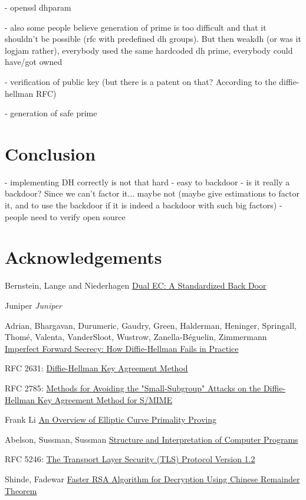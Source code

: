 \documentclass[a4paper,11pt]{article}
\begin{document}
- openssl dhparam

- also some people believe generation of prime is too difficult and that it shouldn't be possible (rfc with predefined dh groups). But then weakdh (or was it logjam rather), everybody used the same hardcoded dh prime, everybody could have/got owned

- verification of public key (but there is a patent on that? According to the diffie-hellman RFC)

- generation of safe prime


\section{Conclusion}

- implementing DH correctly is not that hard
- easy to backdoor
- is it really a backdoor? Since we can't factor it... maybe not (maybe give estimations to factor it, and to use the backdoor if it is indeed a backdoor with such big factors)
- people need to verify open source

\newpage

\section*{Acknowledgements}


\newpage

\begin{thebibliography}{1}

 Bernstein, Lange and Niederhagen \href{https://eprint.iacr.org/2015/767.pdf}{Dual EC: A Standardized Back Door}

 Juniper {\em Juniper}

 Adrian, Bhargavan, Durumeric, Gaudry, Green, Halderman, Heninger, Springall, Thomé, Valenta,  VanderSloot, Wustrow, Zanella-Béguelin, Zimmermann \href{https://weakdh.org/imperfect-forward-secrecy-ccs15.pdf}{Imperfect Forward Secrecy: How Diffie-Hellman Fails in Practice}

 RFC 2631: \href{https://tools.ietf.org/html/rfc2631}{Diffie-Hellman Key Agreement Method}

 RFC 2785: \href{https://tools.ietf.org/html/rfc2785}{Methods for Avoiding the "Small-Subgroup" Attacks on the Diffie-Hellman Key Agreement Method for S/MIME}

 Frank Li \href{http://theory.stanford.edu/~dfreeman/cs259c-f11/finalpapers/primalityproving.pdf}{An Overview of Elliptic Curve Primality Proving}

 Abelson, Sussman, Sussman \href{https://mitpress.mit.edu/sicp/chapter1/footnode.html#2413}{Structure and Interpretation of Computer Programs}

 RFC 5246: \href{https://www.ietf.org/rfc/rfc5246.txt}{The Transport Layer Security (TLS) Protocol Version 1.2}

 Shinde, Fadewar \href{http://www.techscience.com/doi/10.3970/icces.2008.005.255.pdf}{Faster RSA Algorithm for Decryption Using Chinese
Remainder Theorem}

\end{thebibliography}
\end{document}
